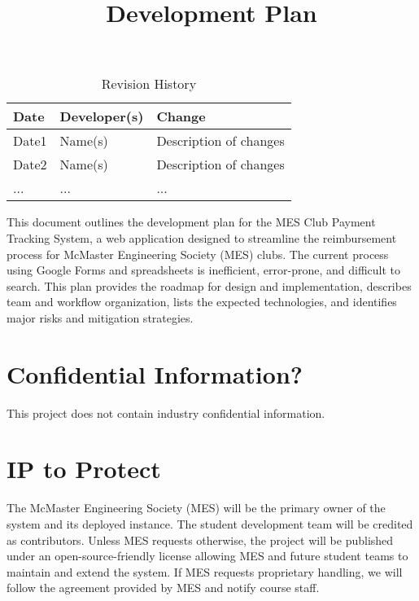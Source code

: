 \documentclass{article}
\title{Development Plan\\\progname}
\author{\authname}
\date{}
\begin{document}
\maketitle

\begin{table}[hp]
\caption{Revision History} \label{TblRevisionHistory}
\begin{tabularx}{\textwidth}{llX}
\toprule
\textbf{Date} & \textbf{Developer(s)} & \textbf{Change}\\
\midrule
Date1 & Name(s) & Description of changes\\
Date2 & Name(s) & Description of changes\\
... & ... & ...\\
\bottomrule
\end{tabularx}
\end{table}

\newpage{}

This document outlines the development plan for the MES Club Payment Tracking System, a web application designed to streamline the reimbursement process for McMaster Engineering Society (MES) clubs. The current process using Google Forms and spreadsheets is inefficient, error-prone, and difficult to search. This plan provides the roadmap for design and implementation, describes team and workflow organization, lists the expected technologies, and identifies major risks and mitigation strategies.


\section{Confidential Information?}

This project does not contain industry confidential information.

\section{IP to Protect}

The McMaster Engineering Society (MES) will be the primary owner of the system and its deployed instance. The student development team will be credited as contributors. Unless MES requests otherwise, the project will be published under an open-source-friendly license allowing MES and future student teams to maintain and extend the system. If MES requests proprietary handling, we will follow the agreement provided by MES and notify course staff.
\end{document}
